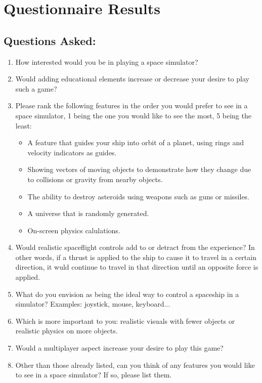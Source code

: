 \section*{Questionnaire Results}

\subsection*{Questions Asked:}
\begin{enumerate}

  \item How interested would you be in playing a space simulator?

  \item Would adding educational elements increase or decrease your desire to play such a game?

  \item Please rank the following features in the order you would prefer to see in a space simulator, 1 being the one you would like to see the most, 5 being the least:
  \begin{itemize}

        \item A feature that guides your ship into orbit of a planet, using rings and velocity indicators as guides.

        \item Showing vectors of moving objects to demonstrate how they change due to collisions or gravity from nearby objects.

        \item The ability to destroy asteroids using weapons such as guns or missiles.

        \item A universe that is randomly generated.

        \item On-screen physics calulations.

  \end{itemize}

  \item Would realistic spaceflight controls add to or detract from the experience? In other words, if a thrust is applied to the ship to cause it to travel in a certain direction, it wuld continue to travel in that direction until an opposite force is applied.

  \item What do you envision as being the ideal way to control a spaceship in a simulator? Examples: joystick, mouse, keyboard...

  \item Which is more important to you: realistic visuals with fewer objects or realistic physics on more objects.

  \item Would a multiplayer aspect increase your desire to play this game?

  \item Other than those already listed, can you think of any features you would like to see in a space simulator? If so, please list them.

\end{enumerate}

